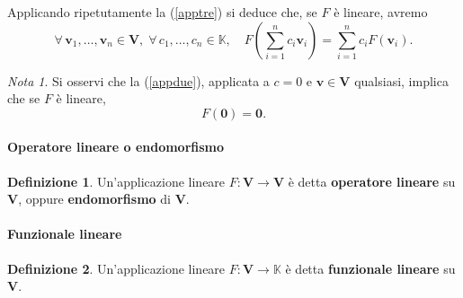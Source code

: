 \documentclass{article}
\theoremstyle{plain}
\theoremstyle{definition}
\newtheorem{defn}{Definizione}[section]
\theoremstyle{remark}
\newtheorem{note}{Nota}
\begin{document}
Applicando ripetutamente la (\ref{apptre}) si deduce che, se $F$ è lineare, avremo
\[\forall\,\mathbf{v}_1, \dots, \mathbf{v}_n\in \mathbf{V},\;\forall\, c_1,\dots,c_n\in\mathbb{K},\quad F\left(\sum_{i=1}^{n}c_i\mathbf{v}_i\right)=\sum_{i=1}^{n}c_iF(\mathbf{v}_i).\]

\vspace{10pt}

\begin{note}
Si osservi che la (\ref{appdue}), applicata a $c=0$ e $\mathbf{v}\in\mathbf{V}$ qualsiasi, implica che se $F$ è lineare, \[F(\mathbf{0})=\mathbf{0}.\]    
\end{note}

\vspace{10pt}

\paragraph{Operatore lineare o endomorfismo}
\begin{bxthm}
\begin{defn}
    Un'applicazione lineare $F:\mathbf{V}\to\mathbf{V}$ è detta \textbf{operatore lineare} su $\mathbf{V}$, oppure \textbf{endomorfismo} di $\mathbf{V}$.
\end{defn}
\end{bxthm}

\vspace{10pt}

\paragraph{Funzionale lineare}
\begin{bxthm}
\begin{defn}
    Un'applicazione lineare $F:\mathbf{V}\to\mathbb{K}$ è detta \textbf{funzionale lineare} su $\mathbf{V}$.
\end{defn}
\end{bxthm}

\vspace{10pt}
\end{document}
